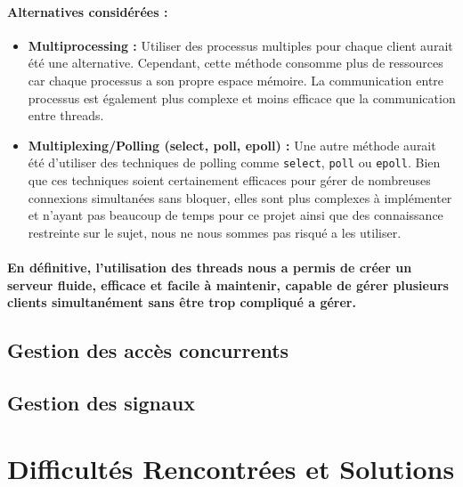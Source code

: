 \documentclass[utf8]{article}
\begin{document}
\paragraph{Alternatives considérées :}
\begin{itemize}
    \item \textbf{Multiprocessing :} Utiliser des processus multiples pour chaque client aurait été une alternative. Cependant, cette méthode consomme plus de ressources car chaque processus a son propre espace mémoire. La communication entre processus est également plus complexe et moins efficace que la communication entre threads.
    \item \textbf{Multiplexing/Polling (select, poll, epoll) :} Une autre méthode aurait été d'utiliser des techniques de polling comme \texttt{select}, \texttt{poll} ou \texttt{epoll}. Bien que ces techniques soient certainement efficaces pour gérer de nombreuses connexions simultanées sans bloquer, elles sont plus complexes à implémenter et n'ayant pas beaucoup de temps pour ce projet ainsi que des connaissance restreinte sur le sujet, nous ne nous sommes pas risqué a les utiliser.
\end{itemize}

\paragraph{En définitive, l'utilisation des threads nous a permis de créer un serveur fluide, efficace et facile à maintenir, capable de gérer plusieurs clients simultanément sans être trop compliqué a gérer.}

\subsection{Gestion des accès concurrents}
\paragraph{}

\subsection{Gestion des signaux}
\paragraph{}

\section{Difficultés Rencontrées et Solutions}
\end{document}
